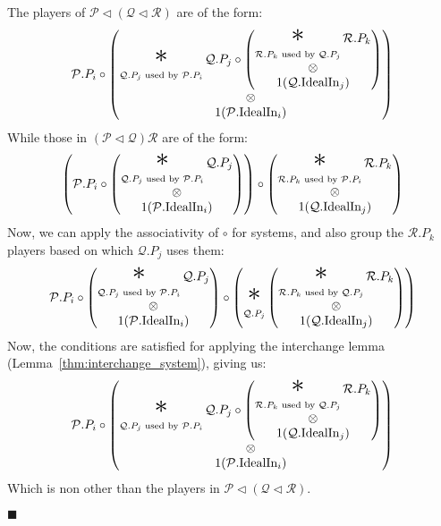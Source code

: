\begin{lemma}
The players of $\mathcal{P} \lhd (\mathcal{Q} \lhd \mathcal{R})$ are of the form:
$$
  \mathcal{P}.P_i \circ
  \begin{pmatrix}
  \displaystyle \bigast_{\mathcal{Q}.P_j \text{ used by } \mathcal{P}.P_i } 
  \mathcal{Q}.P_j \circ
  \begin{pmatrix}
  \displaystyle \bigast_{\mathcal{R}.P_k \text{ used by } \mathcal{Q}.P_j } \mathcal{R}.P_k\cr
  \otimes\cr
  1(\mathcal{Q}.\tx{IdealIn}_j)
  \end{pmatrix}\cr
  \otimes\cr
  1(\mathcal{P}.\tx{IdealIn}_i)
  \end{pmatrix}
$$
While those in $(\mathcal{P} \lhd \mathcal{Q}) \mathcal{R}$ are of the form:
$$
  \left( \mathcal{P}.P_i \circ
  \begin{pmatrix}
  \displaystyle \bigast_{\mathcal{Q}.P_j \text{ used by } \mathcal{P}.P_i } 
  \mathcal{Q}.P_j\cr
  \otimes\cr
  1(\mathcal{P}.\tx{IdealIn}_i)
  \end{pmatrix}
  \right)
  \circ
  \begin{pmatrix}
    \displaystyle \bigast_{\mathcal{R}.P_k \text{ used by } \mathcal{P}.P_i } \mathcal{R}.P_k\cr
  \otimes\cr
  1(\mathcal{Q}.\tx{IdealIn}_j)
  \end{pmatrix}
$$
Now, we can apply the associativity of $\circ$ for systems, and also
group the $\mathcal{R}.P_k$ players based on which $\mathcal{Q}.P_j$ uses them:
$$
  \mathcal{P}.P_i \circ
  \begin{pmatrix}
  \displaystyle \bigast_{\mathcal{Q}.P_j \text{ used by } \mathcal{P}.P_i } 
  \mathcal{Q}.P_j\cr
  \otimes\cr
  1(\mathcal{P}.\tx{IdealIn}_i)
  \end{pmatrix}
  \circ
  \left(
    \displaystyle \bigast_{\mathcal{Q}.P_j}
  \begin{pmatrix}
  \displaystyle \bigast_{\mathcal{R}.P_k \text{ used by } \mathcal{Q}.P_j } \mathcal{R}.P_k
  \cr
  \otimes\cr
  1(\mathcal{Q}.\tx{IdealIn}_j)
  \end{pmatrix}
  \right)
$$
Now, the conditions are satisfied for applying the interchange lemma (Lemma~\ref{thm:interchange_system}),
giving us:
$$
  \mathcal{P}.P_i \circ
  \begin{pmatrix}
  \displaystyle \bigast_{\mathcal{Q}.P_j \text{ used by } \mathcal{P}.P_i } 
  \mathcal{Q}.P_j \circ
  \begin{pmatrix}
  \displaystyle \bigast_{\mathcal{R}.P_k \text{ used by } \mathcal{Q}.P_j } \mathcal{R}.P_k\cr
  \otimes\cr
  1(\mathcal{Q}.\tx{IdealIn}_j)
  \end{pmatrix}\cr
  \otimes\cr
  1(\mathcal{P}.\tx{IdealIn}_i)
  \end{pmatrix}
$$
Which is non other than the players in $\mathcal{P} \lhd (\mathcal{Q} \lhd \mathcal{R})$.

$\blacksquare$
\end{lemma}


